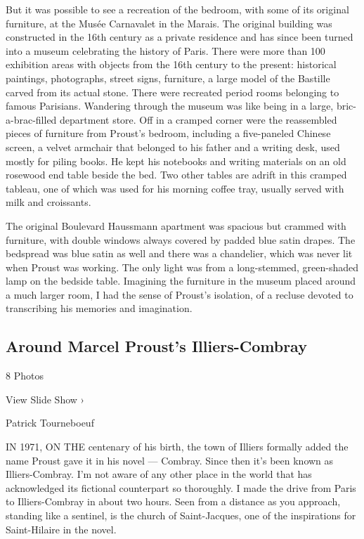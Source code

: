 But it was possible to see a recreation of the bedroom, with some of its
original furniture, at the Musée Carnavalet in the Marais. The original
building was constructed in the 16th century as a private residence and
has since been turned into a museum celebrating the history of Paris.
There were more than 100 exhibition areas with objects from the 16th
century to the present: historical paintings, photographs, street signs,
furniture, a large model of the Bastille carved from its actual stone.
There were recreated period rooms belonging to famous Parisians.
Wandering through the museum was like being in a large,
bric-a-brac-filled department store. Off in a cramped corner were the
reassembled pieces of furniture from Proust's bedroom, including a
five-paneled Chinese screen, a velvet armchair that belonged to his
father and a writing desk, used mostly for piling books. He kept his
notebooks and writing materials on an old rosewood end table beside the
bed. Two other tables are adrift in this cramped tableau, one of which
was used for his morning coffee tray, usually served with milk and
croissants.

The original Boulevard Haussmann apartment was spacious but crammed with
furniture, with double windows always covered by padded blue satin
drapes. The bedspread was blue satin as well and there was a chandelier,
which was never lit when Proust was working. The only light was from a
long-stemmed, green-shaded lamp on the bedside table. Imagining the
furniture in the museum placed around a much larger room, I had the
sense of Proust's isolation, of a recluse devoted to transcribing his
memories and imagination.

\href{https://www.nytimes3xbfgragh.onion/slideshow/2017/05/15/t-magazine/around-marcel-prousts-illiers-combray.html}{}

\hypertarget{around-marcel-prousts-illiers-combray}{%
\subsection{Around Marcel Proust's
Illiers-Combray}\label{around-marcel-prousts-illiers-combray}}

8 Photos

View Slide Show ›

Patrick Tourneboeuf

IN 1971, ON THE centenary of his birth, the town of Illiers formally
added the name Proust gave it in his novel --- Combray. Since then it's
been known as Illiers-Combray. I'm not aware of any other place in the
world that has acknowledged its fictional counterpart so thoroughly. I
made the drive from Paris to Illiers-Combray in about two hours. Seen
from a distance as you approach, standing like a sentinel, is the church
of Saint-Jacques, one of the inspirations for Saint-Hilaire in the
novel.

